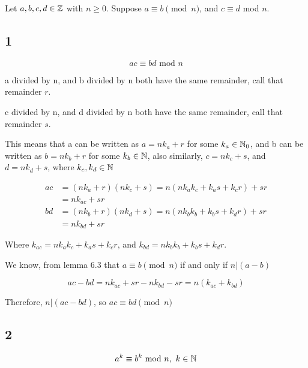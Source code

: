 \documentclass[12pt]{article} %
\begin{document}
\begin{homeworkProblem}
    \begin{grayBoxed}
        Let $a, b, c, d \in \mathbb{Z}$ with $n \geq 0$. Suppose $a \equiv b \pmod{n}$, and $c \equiv d$ mod $n$.
    \end{grayBoxed}

    \subsection*{1}
    \begin{grayBoxed}
        $$
            ac \equiv bd \text{ mod } n
        $$
    \end{grayBoxed}

    a divided by n, and b divided by n both have the same remainder, call that remainder $r$.

    c divided by n, and d divided by n both have the same remainder, call that remainder $s$.

    This means that a can be written as $a = nk_a + r$ for some $k_a \in \mathbb{N}_0$, and b can be written as $b = nk_b + r$ for some $k_b \in \mathbb{N}$, also
    similarly, $c = nk_c + s$, and $d = nk_d + s$, where $k_c, k_d \in \mathbb{N}$

    \begin{align*}
        ac & = (nk_a + r)(nk_c + s) = n(nk_ak_c + k_as + k_cr) + sr \\
           & = nk_{ac} + sr                                         \\
        bd & = (nk_b + r)(nk_d + s) = n(nk_bk_b + k_bs + k_dr) + sr \\
           & = nk_{bd} + sr
    \end{align*}

    Where $k_{ac} = nk_ak_c + k_as + k_cr$, and $k_{bd} = nk_bk_b + k_bs + k_dr$.


    We know, from lemma 6.3 that $a \equiv b \pmod{n}$ if and only if $n | (a - b)$

    $$
        ac - bd = nk_{ac} + sr - nk_{bd} - sr = n(k_{ac} + k_{bd})
    $$

    Therefore, $n | (ac - bd)$, so $ac \equiv bd \pmod{n}$

    \subsection*{2}
    \begin{grayBoxed}
        $$
            a^k \equiv b^k \text{ mod } n, \ k \in \mathbb{N}
        $$
    \end{grayBoxed}


\end{homeworkProblem}
\end{document}
